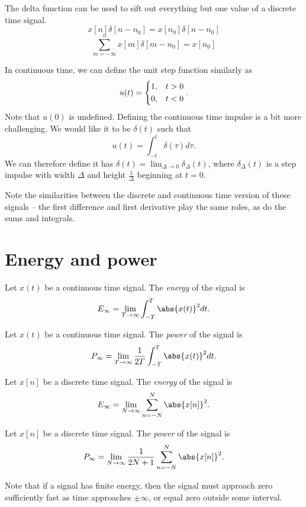 \documentclass[12pt]{article}
\begin{document}
The delta function can be used to sift out everything but one value of a discrete time signal.
\[x[n]\delta[n-n_0] = x[n_0]\delta[n-n_0]\]
\[\sum_{m=-\infty}^n x[m]\delta[m-n_0] = x[n_0]\]

In continuous time, we can define the unit step function similarly as \[u(t) =
\begin{dcases}
    1, & t > 0 \\
    0, & t < 0
\end{dcases}.\]
Note that $u(0)$ is undefined. Defining the continuous time impulse is a bit more challenging. We would like it to be $\delta(t)$ such that
\[u(t) = \int_{-t}^{t}\delta(\tau)d\tau.\] We can therefore define it has $\delta(t) = \lim_{\Delta\to 0}\delta_{\Delta}(t)$, where $\delta_{\Delta}(t)$ is a step impulse with width $\Delta$ and height $\frac{1}{\Delta}$ beginning at $t = 0$.

Note the similarities between the discrete and continuous time version of these signals -- the first difference and first derivative play the same roles, as do the sums and integrals.

\section{Energy and power}

\begin{defn}
    Let $x(t)$ be a continuous time signal. The \emph{energy} of the signal is
    \[E_{\infty} = \lim_{T\to\infty}\int_{-T}^{T}\abs{x(t)}^2dt.\]
\end{defn}

\begin{defn}
    Let $x(t)$ be a continuous time signal. The \emph{power} of the signal is
    \[P_{\infty} = \lim_{T \to \infty}\frac{1}{2T}\int_{-T}^T\abs{x(t)}^2dt.\]
\end{defn}

\begin{defn}
    Let $x[n]$ be a discrete time signal. The \emph{energy} of the signal is
    \[E_{\infty} = \lim_{N\to\infty}\sum_{n=-N}^{N}\abs{x[n]}^2.\]
\end{defn}

\begin{defn}
    Let $x[n]$ be a discrete time signal. The \emph{power} of the signal is
    \[P_{\infty} = \lim_{N \to \infty}\frac{1}{2N+1}\sum_{n=-N}^N\abs{x[n]}^2.\]
\end{defn}

Note that if a signal has finite energy, then the signal must approach zero sufficiently fast as time approaches $\pm\infty$, or equal zero outside some interval.
\end{document}
